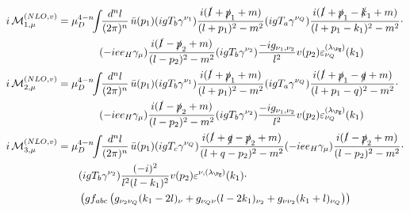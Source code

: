 \begin{align}
i\Md^{(NLO,v)}_{1,\mu} &=\mu_D^{4-n}\!\!\int\!\!\frac{d^nl}{(2\pi)^n}\,\bar u(p_1)(igT_b\gamma^{\nu_1})\frac{i(\slashed{l}+\slashed{p}_1+m)}{(l+p_1)^2-m^2}(igT_a\gamma^{\nu_Q})\frac{i(\slashed{l}+\slashed{p}_1-\slashed{k}_1+m)}{(l+p_1-k_1)^2-m^2}\cdot\nonumber\\
 &\hspace{40pt}(-i e e_H \gamma_\mu)\frac{i(\slashed{l}-\slashed{p}_2+m)}{(l-p_2)^2-m^2}(igT_b\gamma^{\nu_2})\frac{-ig_{\nu_1,\nu_2}}{l^2}v(p_2)\varepsilon^{(\lambda_{\Pg})}_{\nu_Q}(k_1)\\
i\Md^{(NLO,v)}_{2,\mu} &= \mu_D^{4-n}\!\!\int\!\!\frac{d^nl}{(2\pi)^n}\,\bar u(p_1)(igT_b\gamma^{\nu_1})\frac{i(\slashed{l}+\slashed{p}_1+m)}{(l+p_1)^2-m^2}(igT_a\gamma^{\nu_Q})\frac{i(\slashed{l}+\slashed{p}_1-\slashed{q}+m)}{(l+p_1-q)^2-m^2}\cdot\nonumber\\
 &\hspace{40pt}(-i e e_H \gamma_\mu)\frac{i(\slashed{l}-\slashed{p}_2+m)}{(l-p_2)^2-m^2}(igT_b\gamma^{\nu_2})\frac{-ig_{\nu_1,\nu_2}}{l^2}v(p_2)\varepsilon^{(\lambda_{\Pg})}_{\nu_Q}(k_1)\\
i\Md^{(NLO,v)}_{3,\mu} &=\mu_D^{4-n}\!\!\int\!\!\frac{d^nl}{(2\pi)^n}\,\bar u(p_1)(igT_c\gamma^{\nu_Q})\frac{i(\slashed{l}+\slashed{q}-\slashed{p}_2+m)}{(l+q-p_2)^2-m^2}(-i e e_H \gamma_\mu)\frac{i(\slashed{l}-\slashed{p}_2+m)}{(l-p_2)^2-m^2}\cdot\nonumber\\
 &\hspace{20pt}(igT_b\gamma^{\nu_2})\frac{(-i)^2}{l^2(l-k_1)^2}v(p_2)\varepsilon^{\nu,(\lambda_{\Pg})}(k_1)\cdot\nonumber\\
 &\hspace{20pt}\left(gf_{abc}\left(g_{\nu_2\nu_Q}(k_1-2l)_\nu+g_{\nu_Q\nu}(l-2k_1)_{\nu_2}+g_{\nu\nu_2}(k_1+l)_{\nu_Q}\right)\right)
\end{align}

\pagebreak

